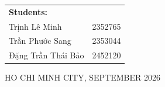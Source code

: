 \begin{titlepage}
\begin{table}[h]
\begin{tabular}{p{6cm} r}
\textbf{Students:} &  \\

Trịnh Lê Minh      & 2352765 \\
Trần Phước Sang    & 2353044 \\
Đặng Trần Thái Bảo& 2452120  \\

\end{tabular}
\end{table}


\vspace{1cm}
\begin{center}
{\footnotesize HO CHI MINH CITY, SEPTEMBER 2026}
\end{center}
\end{titlepage}
\pagebreak
